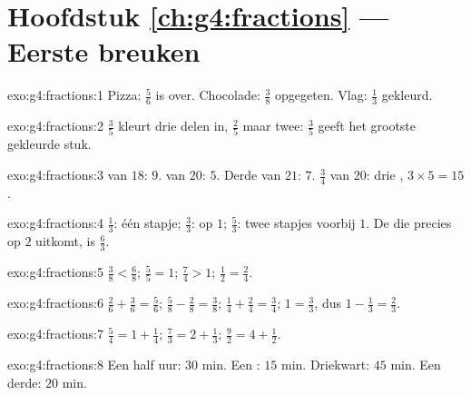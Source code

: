 \section*{Hoofdstuk \ref{ch:g4:fractions} --- Eerste breuken}

\begin{solution}{exo:g4:fractions:1}
Pizza: $\frac56$ is over. Chocolade: $\frac38$ opgegeten. Vlag: $\frac13$
gekleurd.
\end{solution}

\begin{solution}{exo:g4:fractions:2}
$\frac35$ kleurt drie delen in, $\frac25$ maar twee: $\frac35$ geeft het
grootste gekleurde stuk.
\end{solution}

\begin{solution}{exo:g4:fractions:3}
 van $18$: $9$.  van $20$: $5$. Derde van $21$: $7$. $\frac34$
van $20$: drie , $3 \times 5 = 15$.
\end{solution}

\begin{solution}{exo:g4:fractions:4}
$\frac13$: één stapje; $\frac33$: op $1$; $\frac53$: twee stapjes voorbij
$1$. De  die precies op $2$ uitkomt, is $\frac63$.
\end{solution}

\begin{solution}{exo:g4:fractions:5}
$\frac38 < \frac68$; \quad $\frac55 = 1$; \quad $\frac74 > 1$;
\quad $\frac12 = \frac24$.
\end{solution}

\begin{solution}{exo:g4:fractions:6}
$\frac26 + \frac36 = \frac56$; \quad
$\frac58 - \frac28 = \frac38$; \quad
$\frac14 + \frac24 = \frac34$; \quad
$1 = \frac33$, dus $1 - \frac13 = \frac23$.
\end{solution}

\begin{solution}{exo:g4:fractions:7}
$\frac54 = 1 + \frac14$; \quad
$\frac73 = 2 + \frac13$; \quad
$\frac92 = 4 + \frac12$.
\end{solution}

\begin{solution}{exo:g4:fractions:8}
Een half uur: $30$ min. Een : $15$ min. Driekwart: $45$ min. Een
derde: $20$ min.
\end{solution}

